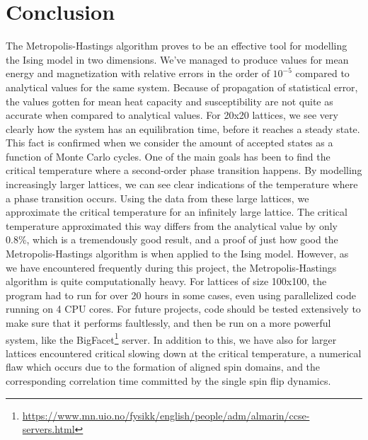 \section{Conclusion}
The Metropolis-Hastings algorithm proves to be an effective tool for modelling the Ising model in two dimensions. We've managed to produce values for mean energy and magnetization with relative errors in the order of $10^{-5}$ compared to analytical values for the same system. Because of propagation of statistical error, the values gotten for mean heat capacity and susceptibility are not quite as accurate when compared to analytical values. For 20x20 lattices, we see very clearly how the system has an equilibration time, before it reaches a steady state. This fact is confirmed when we consider the amount of accepted states as a function of Monte Carlo cycles. One of the main goals has been to find the critical temperature where a second-order phase transition happens. By modelling increasingly larger lattices, we can see clear indications of the temperature where a phase transition occurs. Using the data from these large lattices, we approximate the critical temperature for an infinitely large lattice. The critical temperature approximated this way differs from the analytical value by only 0.8\%, which is a tremendously good result, and a proof of just how good the Metropolis-Hastings algorithm is when applied to the Ising model. However, as we have encountered frequently during this project, the Metropolis-Hastings algorithm is quite computationally heavy. For lattices of size 100x100, the program had to run for over 20 hours in some cases, even using parallelized code running on 4 CPU cores. For future projects, code should be tested extensively to make sure that it performs faultlessly, and then be run on a more powerful system, like the BigFacet\footnote{\url{https://www.mn.uio.no/fysikk/english/people/adm/almarin/ccse-servers.html}} server. In addition to this, we have also for larger lattices encountered critical slowing down at the critical temperature, a numerical flaw which occurs due to the formation of aligned spin domains, and the corresponding correlation time committed by the single spin flip dynamics.
